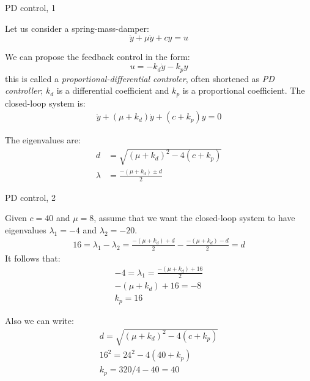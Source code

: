 \documentclass{beamer}
\begin{document}
\begin{frame}{PD control, 1}
	\begin{flushleft}
		
		Let us consider a spring-mass-damper:
		\begin{equation}
			\ddot y + \mu \dot y + c y = u
		\end{equation}
		
		We can propose the feedback control in the form:
		\begin{equation}
			u = -k_d \dot y  -k_p y 
		\end{equation}
		this is called a \emph{proportional-differential controler}, often shortened as \emph{PD controller}; $k_d$ is a differential coefficient and $k_p$ is a proportional coefficient. The closed-loop system is:
		\begin{align}
			\ddot y + (\mu + k_d) \dot y + (c+k_p) y = 0
		\end{align}
		
		The eigenvalues are:
		\begin{align}
			d &= \sqrt{(\mu + k_d)^2 - 4 (c+k_p)}
			\\
			\lambda &= \frac{-(\mu + k_d) \pm d}{2} 
		\end{align}
		
		
	\end{flushleft}
\end{frame}



\begin{frame}{PD control, 2}
	\begin{flushleft}
		
		Given $c = 40$ and $\mu = 8$, assume that we want the closed-loop system to have eigenvalues $\lambda_1 = -4$ and $\lambda_2 = -20$.
		\begin{align}
			16 = \lambda_1 - \lambda_2= \frac{-(\mu + k_d) +d}{2} - \frac{-(\mu + k_d) - d}{2}  = d
		\end{align}
		It follows that:
		\begin{align}
			-4 = \lambda_1 = \frac{-(\mu + k_d) + 16}{2}
			\\
			-(\mu + k_d) + 16 = -8
			\\
			k_p  = 16
		\end{align}
		
		
		Also we can write:
		\begin{align}
			d = \sqrt{(\mu + k_d)^2 - 4 (c+k_p)}
			\\
			16^2 = 24^2 - 4 (40 + k_p)
			\\
			k_p = 320 / 4 - 40 = 40
		\end{align}
		
		
	\end{flushleft}
\end{frame}
\end{document}
